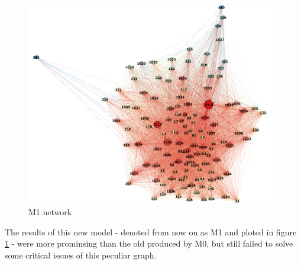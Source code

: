 \documentclass[11pt,twoside]{report}
\begin{document}
\begin{figure}[H]
	\begin{center}
		\includegraphics[width=14cm]{./pictures/M1_gephi.png}
	\end{center}
	\caption{M1 network}
	\label{fig:M1_gephi}
\end{figure}

The results of this new model - denoted from now on as M1 and ploted in figure \ref{fig:M1_gephi} - were more prominsing than the old produced by M0, but still failed to solve some critical issues of this peculiar graph.
\end{document}
